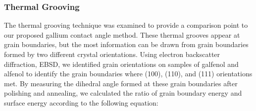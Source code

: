 
\subsubsection{Thermal Grooving}

The thermal grooving technique was examined to provide a comparison point to our proposed gallium contact angle method.  These thermal grooves appear at grain boundaries, but the most information can be drawn from grain boundaries formed by two different crystal orientations. Using electron backscatter diffraction, EBSD, we identified grain orientations on samples of galfenol and alfenol to identify the grain boundaries where \hkl(100), \hkl(110), and \hkl(111) orientations met.  By measuring the dihedral angle formed at these grain boundaries after polishing and annealing, we calculated the ratio of grain boundary energy and surface energy according to the following equation: 

